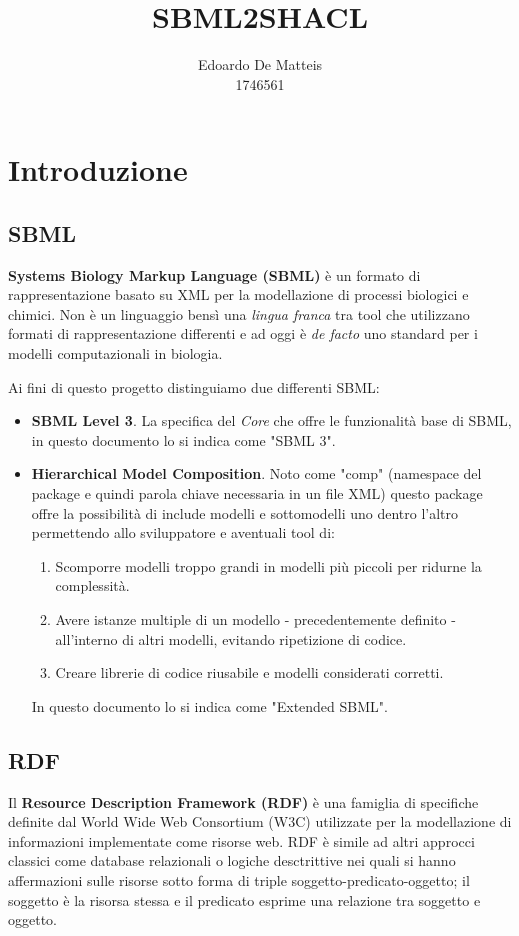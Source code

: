 \documentclass{article}
\title{SBML2SHACL}
\author{Edoardo De Matteis \\ 1746561}
\begin{document}
\maketitle
\tableofcontents

\clearpage

\section{Introduzione}

\subsection{SBML}
\textbf{Systems Biology Markup Language (SBML)} è un formato di rappresentazione basato su XML per la modellazione di processi biologici e chimici. Non è un linguaggio bensì una \textit{lingua franca} tra tool che utilizzano formati di rappresentazione differenti e ad oggi è \textit{de facto} uno standard per i modelli computazionali in biologia. 

Ai fini di questo progetto distinguiamo due differenti SBML:
\begin{itemize}
    \item \textbf{SBML Level 3}. La specifica del \textit{Core} che offre le funzionalità base di SBML, in questo documento lo si indica come "SBML 3".
    \item \textbf{Hierarchical Model Composition}. Noto come "comp" (namespace del package e quindi parola chiave necessaria in un file XML) questo package offre la possibilità di include modelli e sottomodelli uno dentro l'altro permettendo allo sviluppatore e aventuali tool di:
    \begin{enumerate}
        \item Scomporre modelli troppo grandi in modelli più piccoli per ridurne la complessità.
        \item Avere istanze multiple di un modello - precedentemente definito - all'interno di altri modelli, evitando ripetizione di codice. 
        \item Creare librerie di codice riusabile e modelli considerati corretti. 
    \end{enumerate}
    In questo documento lo si indica come "Extended SBML". 
\end{itemize}


\subsection{RDF}
Il \textbf{Resource Description Framework (RDF)} è una famiglia di specifiche definite dal World Wide Web Consortium (W3C) utilizzate per la modellazione di informazioni implementate come risorse web. RDF è simile ad altri approcci classici come database relazionali o logiche desctrittive nei quali si hanno affermazioni sulle risorse sotto forma di triple soggetto-predicato-oggetto; il soggetto è la risorsa stessa e il predicato esprime una relazione tra soggetto e oggetto.
\end{document}
